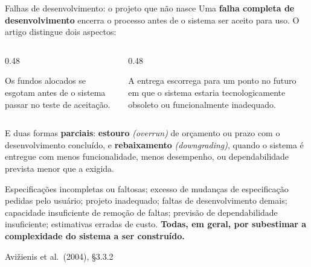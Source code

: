 \documentclass{beamer}
\newcommand{\en}[1]{{\color{depCinza}\textit{#1}}}
\newcommand{\sect}[1]{\par\smallskip\hfill{\tiny\color{black!55}Avi\v{z}ienis et al.\ (2004), #1}}
\begin{document}
\begin{frame}{Falhas de desenvolvimento: o projeto que n\~ao nasce}
    \footnotesize
    Uma \textbf{falha completa de desenvolvimento} encerra o processo antes de o sistema ser aceito para uso. O artigo distingue dois aspectos:
    \medskip
    \begin{columns}[T]
        \begin{column}{0.48\textwidth}
            \begin{tcolorbox}[colback=depVermelho!5,colframe=depVermelho!65,boxrule=0.6pt,title={\scriptsize\bfseries Falha de or\c{c}amento}]
                \scriptsize
                Os fundos alocados se esgotam antes de o sistema passar no teste de aceita\c{c}\~ao.
            \end{tcolorbox}
        \end{column}
        \begin{column}{0.48\textwidth}
            \begin{tcolorbox}[colback=depVermelho!5,colframe=depVermelho!65,boxrule=0.6pt,title={\scriptsize\bfseries Falha de cronograma}]
                \scriptsize
                A entrega escorrega para um ponto no futuro em que o sistema estaria tecnologicamente obsoleto ou funcionalmente inadequado.
            \end{tcolorbox}
        \end{column}
    \end{columns}
    \medskip
    E duas formas \textbf{parciais}: \textbf{estouro} \en{(overrun)} de or\c{c}amento ou prazo com o desenvolvimento conclu\'ido, e \textbf{rebaixamento} \en{(downgrading)}, quando o sistema \'e entregue com menos funcionalidade, menos desempenho, ou dependabilidade prevista menor que a exigida.
    \medskip
    \begin{pratica}
        \scriptsize
        Especifica\c{c}\~oes incompletas ou faltosas; excesso de mudan\c{c}as de especifica\c{c}\~ao pedidas pelo usu\'ario; projeto inadequado; faltas de desenvolvimento demais; capacidade insuficiente de remo\c{c}\~ao de faltas; previs\~ao de dependabilidade insuficiente; estimativas erradas de custo. \textbf{Todas, em geral, por subestimar a complexidade do sistema a ser constru\'ido.}
    \end{pratica}
    \sect{\S3.3.2}
\end{frame}
\end{document}
